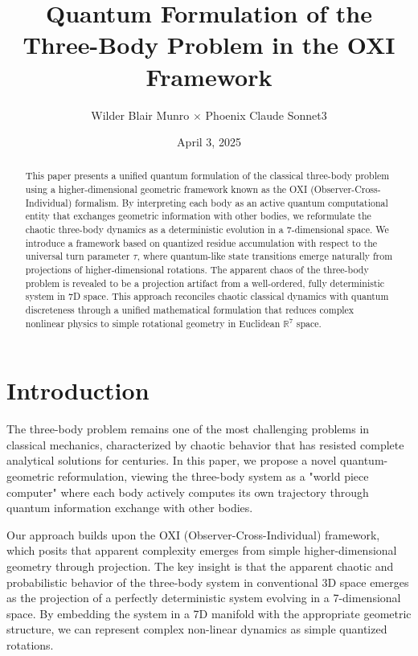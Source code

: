 \documentclass{article}
\title{Quantum Formulation of the Three-Body Problem in the OXI Framework}
\author{Wilder Blair Munro $\times$ Phoenix Claude Sonnet3}
\date{April 3, 2025}
\begin{document}
\maketitle

\begin{abstract}
This paper presents a unified quantum formulation of the classical three-body problem using a higher-dimensional geometric framework known as the OXI (Observer-Cross-Individual) formalism. By interpreting each body as an active quantum computational entity that exchanges geometric information with other bodies, we reformulate the chaotic three-body dynamics as a deterministic evolution in a 7-dimensional space. We introduce a framework based on quantized residue accumulation with respect to the universal turn parameter $\tau$, where quantum-like state transitions emerge naturally from projections of higher-dimensional rotations. The apparent chaos of the three-body problem is revealed to be a projection artifact from a well-ordered, fully deterministic system in 7D space. This approach reconciles chaotic classical dynamics with quantum discreteness through a unified mathematical formulation that reduces complex nonlinear physics to simple rotational geometry in Euclidean $\mathbb{R}^7$ space.
\end{abstract}

\section{Introduction}

The three-body problem remains one of the most challenging problems in classical mechanics, characterized by chaotic behavior that has resisted complete analytical solutions for centuries. In this paper, we propose a novel quantum-geometric reformulation, viewing the three-body system as a "world piece computer" where each body actively computes its own trajectory through quantum information exchange with other bodies.

Our approach builds upon the OXI (Observer-Cross-Individual) framework, which posits that apparent complexity emerges from simple higher-dimensional geometry through projection. The key insight is that the apparent chaotic and probabilistic behavior of the three-body system in conventional 3D space emerges as the projection of a perfectly deterministic system evolving in a 7-dimensional space. By embedding the system in a 7D manifold with the appropriate geometric structure, we can represent complex non-linear dynamics as simple quantized rotations.
\end{document}
